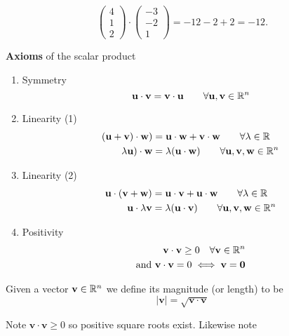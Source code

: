 \documentclass[10pt, a4paper]{article}
\newcommand{\mbf}[1]{\mathbf{#1}}
\begin{document}
\begin{example}
    \[
    \begin{pmatrix}
        4 \\
        1 \\
        2
    \end{pmatrix}
    \cdot
    \begin{pmatrix}
        -3 \\
        -2 \\
        1
    \end{pmatrix}
    =
    -12 - 2 + 2 = -12.
    \]
\end{example}


\textbf{Axioms} of the scalar product
\begin{enumerate}[label = (\roman*)]
    \item Symmetry
    \[
    \mbf{u \cdot v = v \cdot u}\qquad\forall\mbf{u, v} \in \R ^ n
    \]
    \item Linearity (1)
    \begin{align*}
    (\mbf{u + v)\cdot w}) &= \mbf{u \cdot w + v \cdot w}\qquad\forall \lambda \in \R\\
    \lambda\mbf{u})\cdot \mbf{w} &= \lambda (\mbf{u \cdot w})\qquad\forall\mbf{u, v, w} \in \R ^ n
    \end{align*}
    \item Linearity (2)
    \begin{align*}
        \mbf{u} \cdot (\mbf{v + w}) &= \mbf{u} \cdot \mbf{v} + \mbf{u} \cdot \mbf{w}\qquad \forall \lambda \in \R \\
        \mbf{u} \cdot \lambda\mbf{v} &= \lambda(\mbf{u \cdot v})\qquad \forall\mbf{u, v, w} \in \R ^ n
    \end{align*}
    \item Positivity
    \begin{align*}
        \mbf{v \cdot v} \geq 0\quad \forall \mbf{v} \in \R ^ n \\
        \text{and } \mbf{v \cdot v} = 0 \iff \mbf{v = 0}
    \end{align*}
\end{enumerate}

\begin{definition}
    Given a vector $\mbf{v} \in \R ^ n$ we define its magnitude (or length) to be
    \[
    |\mbf{v}| = \sqrt{\mbf{v \cdot v}}
    \]
\end{definition}
Note $\mbf{v \cdot v} \geq 0$ so positive square roots exist. Likewise note
\end{document}
